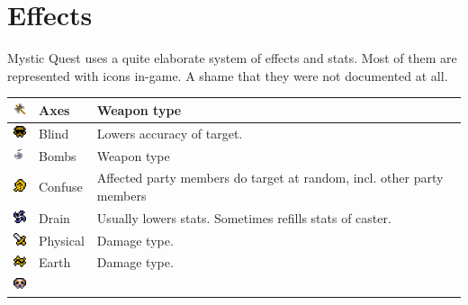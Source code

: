 \chapter{Effects}

Mystic Quest uses a quite elaborate system of effects and stats. Most of them are represented with icons in-game. A shame that they were not documented at all.

\begin{longtable}{ l l p{7cm} }
	\includegraphics[height=1em,keepaspectratio]{./resources/effects/axe}
	& Axes 
	& Weapon type
\\ \hline
	\includegraphics[height=1em,keepaspectratio]{./resources/effects/blind}
	& Blind 
	& Lowers accuracy of target.
\\ \hline
	\includegraphics[height=1em,keepaspectratio]{./resources/effects/bomb}
	& Bombs 
	& Weapon type
\\ \hline
	\includegraphics[height=1em,keepaspectratio]{./resources/effects/confusion}
	& Confuse 
	& Affected party members do target at random, incl. other party members
\\ \hline
	\includegraphics[height=1em,keepaspectratio]{./resources/effects/drain}
	& Drain 
	& Usually lowers stats. Sometimes refills stats of caster.
\\ \hline
	\includegraphics[height=1em,keepaspectratio]{./resources/effects/damage}
	& Physical 
	& Damage type.
\\ \hline
	\includegraphics[height=1em,keepaspectratio]{./resources/effects/earth}
	& Earth 
	& Damage type.
\\ \hline
	\includegraphics[height=1em,keepaspectratio]{./resources/effects/fatal}

\end{longtable}
